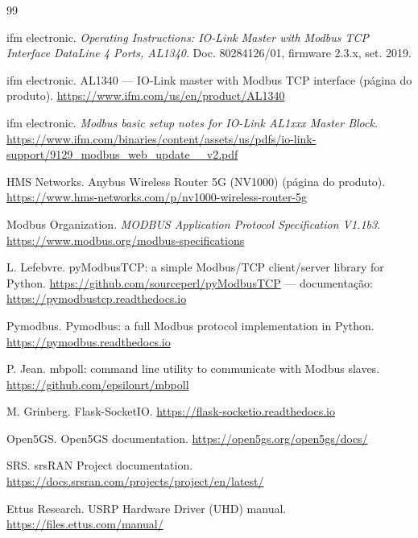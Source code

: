 \documentclass[11pt,a4paper]{article}
\begin{document}
\begin{thebibliography}{99}
\small

ifm electronic.
\newblock \emph{Operating Instructions: IO-Link Master with Modbus TCP
  Interface DataLine 4 Ports, AL1340}.
\newblock Doc. 80284126/01, firmware 2.3.x, set. 2019.

ifm electronic.
\newblock AL1340 --- IO-Link master with Modbus TCP interface (página do produto).
\newblock \url{https://www.ifm.com/us/en/product/AL1340}

ifm electronic.
\newblock \emph{Modbus basic setup notes for IO-Link AL1xxx Master Block}.
\newblock \url{https://www.ifm.com/binaries/content/assets/us/pdfs/io-link-support/9129_modbus_web_update__v2.pdf}

HMS Networks.
\newblock Anybus Wireless Router 5G (NV1000) (página do produto).
\newblock \url{https://www.hms-networks.com/p/nv1000-wireless-router-5g}

Modbus Organization.
\newblock \emph{MODBUS Application Protocol Specification V1.1b3}.
\newblock \url{https://www.modbus.org/modbus-specifications}

L. Lefebvre.
\newblock pyModbusTCP: a simple Modbus/TCP client/server library for Python.
\newblock \url{https://github.com/sourceperl/pyModbusTCP} ---
  documentação: \url{https://pymodbustcp.readthedocs.io}

Pymodbus.
\newblock Pymodbus: a full Modbus protocol implementation in Python.
\newblock \url{https://pymodbus.readthedocs.io}

P. Jean.
\newblock mbpoll: command line utility to communicate with Modbus slaves.
\newblock \url{https://github.com/epsilonrt/mbpoll}

M. Grinberg.
\newblock Flask-SocketIO.
\newblock \url{https://flask-socketio.readthedocs.io}

Open5GS.
\newblock Open5GS documentation.
\newblock \url{https://open5gs.org/open5gs/docs/}

SRS.
\newblock srsRAN Project documentation.
\newblock \url{https://docs.srsran.com/projects/project/en/latest/}

Ettus Research.
\newblock USRP Hardware Driver (UHD) manual.
\newblock \url{https://files.ettus.com/manual/}

\end{thebibliography}
\end{document}
